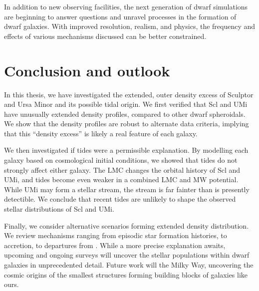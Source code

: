 In addition to new observing facilities, the next generation of dwarf
simulations are beginning to answer questions and unravel processes in
the formation of dwarf galaxies. With improved resolution, realism, and
physics, the frequency and effects of various mechanisms discussed can
be better constrained.

\section{Conclusion and outlook}\label{conclusion-and-outlook}

In this thesis, we have investigated the extended, outer density excess
of Sculptor and Ursa Minor and its possible tidal origin. We first
verified that Scl and UMi have unusually extended density profiles,
compared to other dwarf spheroidals. We show that the density profiles
are robust to alternate data criteria, implying that this ``density
excess'' is likely a real feature of each galaxy.

We then investigated if tides were a permissible explanation. By
modelling each galaxy based on cosmological initial conditions, we
showed that tides do not strongly affect either galaxy. The LMC changes
the orbital history of Scl and UMi, and tides become even weaker in a
combined LMC and MW potential. While UMi may form a stellar stream, the
stream is far fainter than is presently detectible. We conclude that
recent tides are unlikely to shape the observed stellar distributions of
Scl and UMi.

Finally, we consider alternative scenarios forming extended density
distribution. We review mechanisms ranging from episodic star formation
histories, to accretion, to departures from \LCDM{}. While a more
precise explanation awaits, upcoming and ongoing surveys will uncover
the stellar populations within dwarf galaxies in unprecedented detail.
Future work will the Milky Way, uncovering the cosmic origins of the
smallest structures forming building blocks of galaxies like ours.
